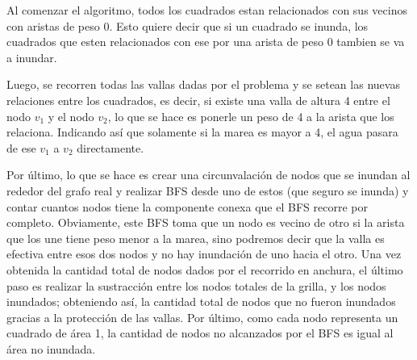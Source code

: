 \documentclass[a4paper, 12pt]{article}
\begin{document}
Al comenzar el algoritmo, todos los cuadrados estan relacionados con sus vecinos con aristas de peso 0. Esto quiere decir que si un cuadrado se inunda, los cuadrados que esten relacionados con ese por una arista de peso 0 tambien se va a inundar. 

Luego, se recorren todas las vallas dadas por el problema y se setean las nuevas relaciones entre los cuadrados, es decir, si existe una valla de altura 4 entre el nodo $v_1$ y el nodo $v_2$, lo que se hace es ponerle un peso de 4 a la arista que los relaciona. Indicando as\'i que solamente si la marea es mayor a 4, el agua pasara de ese $v_1$ a $v_2$ directamente.

Por \'ultimo, lo que se hace es crear una circunvalaci\'on de nodos que se inundan al rededor del grafo real y realizar BFS desde uno de estos (que seguro se inunda) y contar cuantos nodos tiene la componente conexa que el BFS recorre por completo. Obviamente, este BFS toma que un nodo es vecino de otro si la arista que los une tiene peso menor a la marea, sino podremos decir que la valla es efectiva entre esos dos nodos y no hay inundaci\'on de uno hacia el otro. Una vez obtenida la cantidad total de nodos dados por el recorrido en anchura, el \'ultimo paso es realizar la sustracci\'on entre los nodos totales de la grilla, y los nodos inundados; obteniendo as\'i, la cantidad total de nodos que no fueron inundados gracias a la protecci\'on de las vallas. Por \'ultimo, como cada nodo representa un cuadrado de \'area 1, la cantidad de nodos no alcanzados por el BFS es igual al \'area no inundada.
\end{document}
